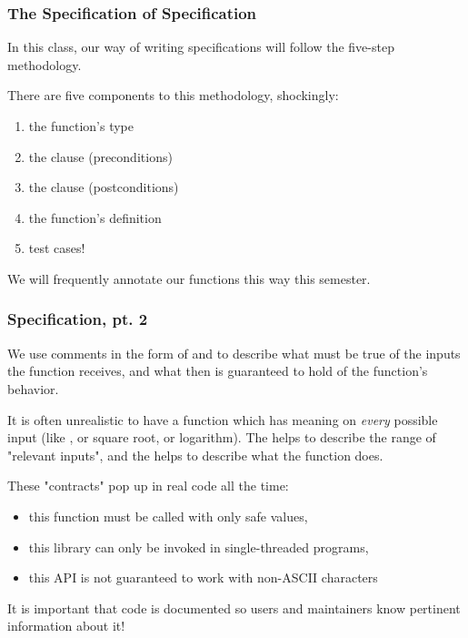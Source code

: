 \documentclass[aspectratio=169]{beamer}
\begin{document}
\begin{frame}[fragile]
  \frametitle{The Specification of Specification}

  In this class, our way of writing specifications will follow the
  five-step methodology.

  \pause
  \vspace{\fill}

  There are five components to this methodology, shockingly:
  \pause
  \begin{enumerate}
    \item the function's type \pause
    \item the  clause (preconditions) \pause
    \item the  clause (postconditions) \pause
    \item the function's definition \pause
    \item test cases! \pause
  \end{enumerate}

  \vspace{\fill}

  We will frequently annotate our functions this way this semester.
\end{frame}

\begin{frame}[fragile]
  \frametitle{Specification, pt. 2}

  We use comments in the form of  and  to describe
  what must be true of the inputs the function receives, and what then is guaranteed
  to hold of the function's behavior.

  \pause
  \vspace{\fill}

  It is often unrealistic to have a function which has meaning on \textit{every} possible
  input (like , or square root, or logarithm). The  helps to
  describe the range of "relevant inputs", and the  helps to describe
  what the function does.

  \pause
  \vspace{\fill}

  These "contracts" pop up in real code all the time:
  \pause
  \begin{itemize}
    \item this function must be called with only safe values, \pause
    \item this library can only be invoked in single-threaded programs, \pause
    \item this API is not guaranteed to work with non-ASCII characters \pause
  \end{itemize}

  \vspace{\fill}

  It is important that code is documented so users and maintainers know pertinent
  information about it!
\end{frame}
\end{document}

